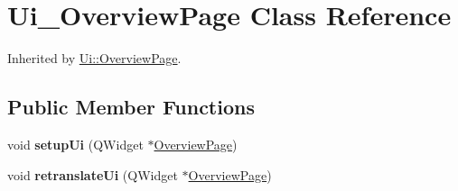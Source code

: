 \hypertarget{class_ui___overview_page}{}\section{Ui\+\_\+\+Overview\+Page Class Reference}
\label{class_ui___overview_page}


Inherited by \mbox{\hyperlink{class_ui_1_1_overview_page}{Ui\+::\+Overview\+Page}}.

\subsection*{Public Member Functions}
\begin{DoxyCompactItemize}
\item 
\mbox{\label{class_ui___overview_page_a9841e4b87092210f086d09ec106fde77}} 
void {\bfseries setup\+Ui} (Q\+Widget $\ast$\mbox{\hyperlink{class_overview_page}{Overview\+Page}})
\item 
\mbox{\label{class_ui___overview_page_ace60e02e872c97647e9e0ddb9acbd249}} 
void {\bfseries retranslate\+Ui} (Q\+Widget $\ast$\mbox{\hyperlink{class_overview_page}{Overview\+Page}})
\end{DoxyCompactItemize}
